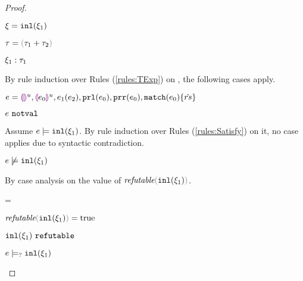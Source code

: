 \begin{proof}
\begin{byCases}
\begin{byCases}
        
    \end{byCases}
\item[\text{(\ref{rule:CTInl})}]
    \begin{pfsteps*}
    \item $\xi=\mathtt{inl}(\xi_1)$ 
    \item $\tau=\tsum{\tau_1}{\tau_2}$ 
    \item $\xi_1 : \tau_1$  
    \end{pfsteps*}
    By rule induction over Rules (\ref{rules:TExp}) on , the following cases apply.
    \begin{byCases}
    \item[\text{(\ref{rule:TEHole}),(\ref{rule:THole}),(\ref{rule:TAp}),(\ref{rule:TPrl}),(\ref{rule:TPrr}),(\ref{rule:TMatchZPre}),(\ref{rule:TMatchNZPre})}]
        \begin{pfsteps*}
        \item $e=\textcolor{violet}{\llparenthesis}\textcolor{violet}{\rrparenthesis}^{u},\textcolor{violet}{\llparenthesis} e_0\textcolor{violet}{\rrparenthesis}^{u},e_1(e_2),\mathtt{prl}(e_0),\mathtt{prr}(e_0),\mathtt{match}(e_0) \{\hat{rs}\}$ 
        \item $e ~\mathtt{notval}$  
        \end{pfsteps*}
        Assume $e \models \mathtt{inl}(\xi_1)$. By rule induction over Rules (\ref{rules:Satisfy}) on it, no case applies due to syntactic contradiction.
        \begin{pfsteps*}
        \item $e \not\models \mathtt{inl}(\xi_1)$  
        \end{pfsteps*}
        By case analysis on the value of $\frefutable{\cinl{\xi_1}}$.
        \begin{byCases}
        \item[\frefutable{\cinl{\xi_1}}=\true]
            \begin{pfsteps*}
            \item $\frefutable{\cinl{\xi_1}}=\true$  
            \item $\mathtt{inl}(\xi_1) ~\mathtt{refutable}$  
            \item $e \models_{?} \mathtt{inl}(\xi_1)$  

\end{pfsteps*}
\end{byCases}
\end{byCases}
\end{byCases}
\end{proof}
